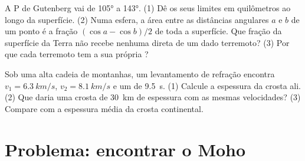 \begin{exercise}[$\star\star\star$]\label{exo:g11:seismic-structure:14}
A  P de Gutenberg vai de \ang{105} a \ang{143}. (1) Dê os seus
limites em quilômetros ao longo da superfície. (2) Numa esfera, a área entre
as distâncias angulares $a$ e $b$ de um ponto é a fração $(\cos a - \cos
b)/2$ de toda a superfície. Que fração da superfície da Terra não recebe
nenhuma  direta de um dado terremoto? (3) Por que cada terremoto tem a
sua própria ?
\end{exercise}

\begin{exercise}[$\star\star\star$]\label{exo:g11:seismic-structure:15}
Sob uma alta cadeia de montanhas, um levantamento de refração encontra $v_1 =
\qty{6.3}{km/s}$, $v_2 = \qty{8.1}{km/s}$ e um  de
\qty{9.5}{s}. (1) Calcule a espessura da crosta ali. (2) Que  daria uma crosta de \qty{30}{km} de espessura com as mesmas
velocidades? (3) Compare com a espessura média da crosta continental.
\end{exercise}

\section{Problema: encontrar o Moho}

